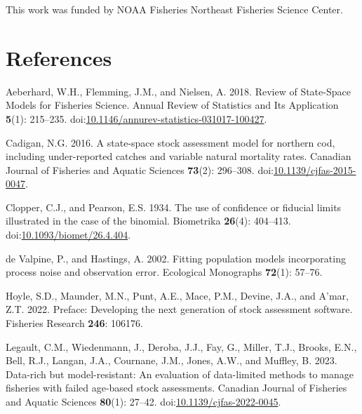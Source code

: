 \documentclass[
  12pt,
]{article}
\newlength{\cslhangindent}
\newlength{\cslentryspacingunit} %
\newenvironment{CSLReferences}[2] %
 {%
  \setlength{\parindent}{0pt}
  \ifodd #1
  \let\oldpar\par
  \def\par{\hangindent=\cslhangindent\oldpar}
  \fi
  \setlength{\parskip}{#2\cslentryspacingunit}
 }%
 {}
\begin{document}
This work was funded by NOAA Fisheries Northeast Fisheries Science
Center.

\pagebreak

\hypertarget{references}{%
\section*{References}\label{references}}

\hypertarget{refs}{}
\begin{CSLReferences}{1}{0}
\leavevmode{}%
Aeberhard, W.H., Flemming, J.M., and Nielsen, A. 2018. Review of
{State}-{Space Models} for {Fisheries Science}. Annual Review of
Statistics and Its Application \textbf{5}(1): 215--235.
doi:\href{https://doi.org/10.1146/annurev-statistics-031017-100427}{10.1146/annurev-statistics-031017-100427}.

\leavevmode{}%
Cadigan, N.G. 2016. A state-space stock assessment model for northern
cod, including under-reported catches and variable natural mortality
rates. Canadian Journal of Fisheries and Aquatic Sciences
\textbf{73}(2): 296--308.
doi:\href{https://doi.org/10.1139/cjfas-2015-0047}{10.1139/cjfas-2015-0047}.

\leavevmode{}%
Clopper, C.J., and Pearson, E.S. 1934. The use of confidence or fiducial
limits illustrated in the case of the binomial. Biometrika
\textbf{26}(4): 404--413.
doi:\href{https://doi.org/10.1093/biomet/26.4.404}{10.1093/biomet/26.4.404}.

\leavevmode{}%
de Valpine, P., and Hastings, A. 2002. Fitting population models
incorporating process noise and observation error. Ecological Monographs
\textbf{72}(1): 57--76.

\leavevmode{}%
Hoyle, S.D., Maunder, M.N., Punt, A.E., Mace, P.M., Devine, J.A., and
A'mar, Z.T. 2022. Preface: Developing the next generation of stock
assessment software. Fisheries Research \textbf{246}: 106176.

\leavevmode{}%
Legault, C.M., Wiedenmann, J., Deroba, J.J., Fay, G., Miller, T.J.,
Brooks, E.N., Bell, R.J., Langan, J.A., Cournane, J.M., Jones, A.W., and
Muffley, B. 2023. Data-rich but model-resistant: An evaluation of
data-limited methods to manage fisheries with failed age-based stock
assessments. Canadian Journal of Fisheries and Aquatic Sciences
\textbf{80}(1): 27--42.
doi:\href{https://doi.org/10.1139/cjfas-2022-0045}{10.1139/cjfas-2022-0045}.


\end{CSLReferences}
\end{document}
